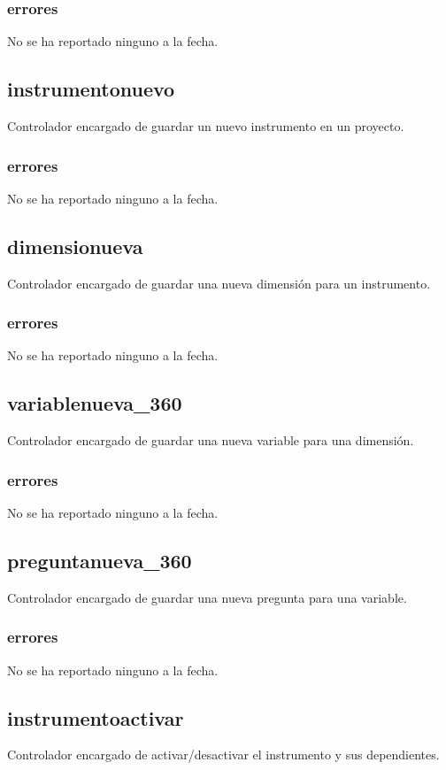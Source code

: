 \documentclass[10pt,a4paper]{book}
\begin{document}
	\subsubsection{errores}
	No se ha reportado ninguno a la fecha.

	\subsection{instrumentonuevo}
	Controlador encargado de guardar un nuevo instrumento en un proyecto.
	\subsubsection{errores}
	No se ha reportado ninguno a la fecha.

	\subsection{dimensionueva}
	Controlador encargado de guardar una nueva dimensión para un instrumento.
	\subsubsection{errores}
	No se ha reportado ninguno a la fecha.

	\subsection{variablenueva\_360}
	Controlador encargado de guardar una nueva variable para una dimensión.
	\subsubsection{errores}
	No se ha reportado ninguno a la fecha.

	\subsection{preguntanueva\_360}
	Controlador encargado de guardar una nueva pregunta para una variable.
	\subsubsection{errores}
	No se ha reportado ninguno a la fecha.

	\subsection{instrumentoactivar}
	Controlador encargado de activar/desactivar el instrumento y sus dependientes.
\end{document}

